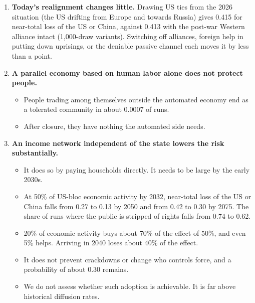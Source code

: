 \documentclass[
  10pt,
]{article}
\providecommand{\tightlist}{%
  \setlength{\itemsep}{0pt}\setlength{\parskip}{0pt}}
\begin{document}
\begin{enumerate}
  \begin{itemize}
  \tightlist
  \item
    A deliberate loss of 10\% or more of the US or China population reaches 0.23 by 2040, 0.37 by
    2050 and 0.50 by 2075. Among runs where it happens, the median year it starts is 2041.5.
  \item
    A deliberate loss of 99.9\% or more reaches 0.05 by 2040, 0.27 by 2050 and 0.42 by 2075 for the
    US or China, 0.76 for at least one of seventeen actors, and 0.08 for the world.
  \item
    Without the threat-elimination assumption (A11), no run reaches 99.9\%.
  \end{itemize}
\item
  \textbf{Today's realignment changes little.} Drawing US ties from the 2026 situation (the US
  drifting from Europe and towards Russia) gives 0.415 for near-total loss of the US or China,
  against 0.413 with the post-war Western alliance intact (1,000-draw variants). Switching off
  alliances, foreign help in putting down uprisings, or the deniable passive channel each moves it
  by less than a point.
\item
  \textbf{A parallel economy based on human labor alone does not protect people.}

  \begin{itemize}
  \tightlist
  \item
    People trading among themselves outside the automated economy end as a tolerated community in
    about 0.0007 of runs.
  \item
    After closure, they have nothing the automated side needs.
  \end{itemize}
\item
  \textbf{An income network independent of the state lowers the risk substantially.}

  \begin{itemize}
  \tightlist
  \item
    It does so by paying households directly. It needs to be large by the early 2030s.
  \item
    At 50\% of US-bloc economic activity by 2032, near-total loss of the US or China falls from 0.27
    to 0.13 by 2050 and from 0.42 to 0.30 by 2075. The share of runs where the public is stripped of
    rights falls from 0.74 to 0.62.
  \item
    20\% of economic activity buys about 70\% of the effect of 50\%, and even 5\% helps. Arriving in
    2040 loses about 40\% of the effect.
  \item
    It does not prevent crackdowns or change who controls force, and a probability of about 0.30
    remains.
  \item
    We do not assess whether such adoption is achievable. It is far above historical diffusion
    rates.
  \end{itemize}
\end{enumerate}
\end{document}
